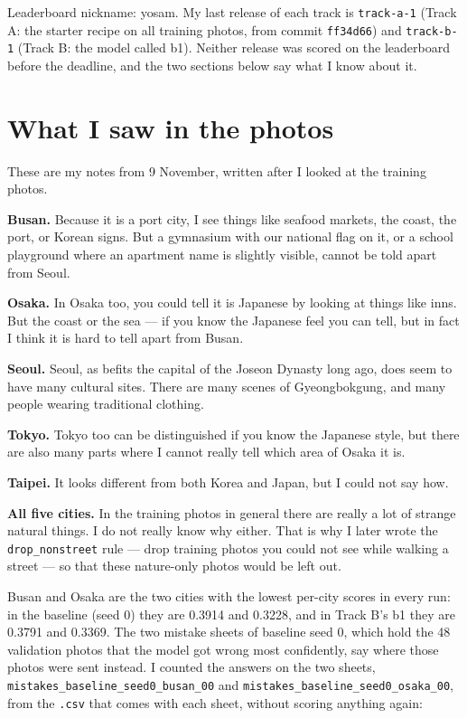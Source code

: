 \documentclass[11pt]{article}
\begin{document}
\makeheader

Leaderboard nickname: yosam. My last release of each track is
\texttt{track-a-1} (Track A: the starter recipe on all training photos, from
commit \texttt{ff34d66}) and \texttt{track-b-1} (Track B: the model called b1).
Neither release was scored on the leaderboard before the deadline, and the two
sections below say what I know about it.


\section*{What I saw in the photos}

These are my notes from 9 November, written after I looked at the training
photos.

\textbf{Busan.} Because it is a port city, I see things like seafood markets,
the coast, the port, or Korean signs. But a gymnasium with our national flag on
it, or a school playground where an apartment name is slightly visible, cannot
be told apart from Seoul.

\textbf{Osaka.} In Osaka too, you could tell it is Japanese by looking at
things like inns. But the coast or the sea --- if you know the Japanese feel
you can tell, but in fact I think it is hard to tell apart from Busan.

\textbf{Seoul.} Seoul, as befits the capital of the Joseon Dynasty long ago,
does seem to have many cultural sites. There are many scenes of Gyeongbokgung,
and many people wearing traditional clothing.

\textbf{Tokyo.} Tokyo too can be distinguished if you know the Japanese style,
but there are also many parts where I cannot really tell which area of Osaka it
is.

\textbf{Taipei.} It looks different from both Korea and Japan, but I could not
say how.

\textbf{All five cities.} In the training photos in general there are really a
lot of strange natural things. I do not really know why either. That is why I
later wrote the \texttt{drop\_nonstreet} rule --- drop training photos you could
not see while walking a street --- so that these nature-only photos would be
left out.

Busan and Osaka are the two cities with the lowest per-city scores in every run:
in the baseline (seed 0) they are 0.3914 and 0.3228, and in Track B's b1 they
are 0.3791 and 0.3369. The two mistake sheets of baseline seed 0, which hold the
48 validation photos that the model got wrong most confidently, say where those
photos were sent instead. I counted the answers on the two sheets,
\texttt{mistakes\_baseline\_seed0\_busan\_00} and
\texttt{mistakes\_baseline\_seed0\_osaka\_00}, from the \texttt{.csv} that comes
with each sheet, without scoring anything again:
\end{document}
